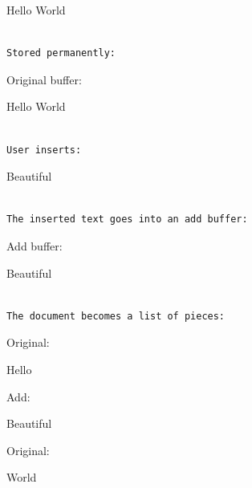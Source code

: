 \documentclass[
  oneside,
  openany]{book}
\begin{document}
Hello World

\begin{verbatim}

Stored permanently:
\end{verbatim}

Original buffer:

Hello World

\begin{verbatim}

User inserts:
\end{verbatim}

Beautiful

\begin{verbatim}

The inserted text goes into an add buffer:
\end{verbatim}

Add buffer:

Beautiful

\begin{verbatim}

The document becomes a list of pieces:
\end{verbatim}

Original:

Hello

Add:

Beautiful

Original:

World
\end{document}
